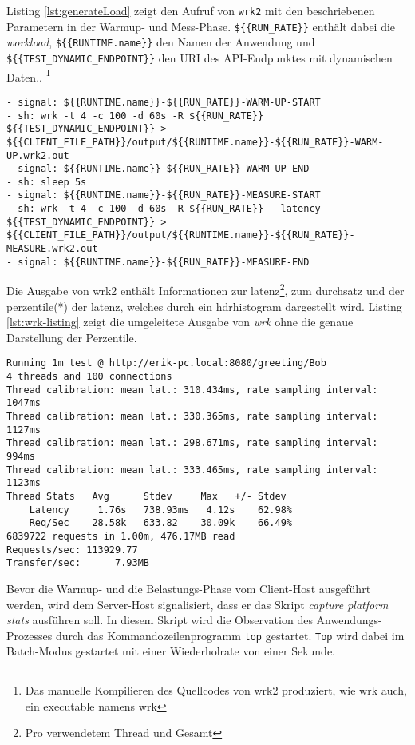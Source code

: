Listing \ref*{lst:generateLoad} zeigt den Aufruf von \verb|wrk2| mit den beschriebenen Parametern in der Warmup- und Mess-Phase.
\verb|${{RUN_RATE}}| enthält dabei die \textit{workload}, \verb|${{RUNTIME.name}}| den Namen der Anwendung und \verb|${{TEST_DYNAMIC_ENDPOINT}}| den
URI des API-Endpunktes mit dynamischen Daten..
\footnote{Das manuelle Kompilieren des Quellcodes von wrk2 produziert, wie wrk auch, ein executable namens wrk}

\begin{lstlisting}[caption=Auszug des qDup Skripts generate load, captionpos=b, label=lst:generateLoad]
- signal: ${{RUNTIME.name}}-${{RUN_RATE}}-WARM-UP-START
- sh: wrk -t 4 -c 100 -d 60s -R ${{RUN_RATE}} ${{TEST_DYNAMIC_ENDPOINT}} > ${{CLIENT_FILE_PATH}}/output/${{RUNTIME.name}}-${{RUN_RATE}}-WARM-UP.wrk2.out
- signal: ${{RUNTIME.name}}-${{RUN_RATE}}-WARM-UP-END
- sh: sleep 5s
- signal: ${{RUNTIME.name}}-${{RUN_RATE}}-MEASURE-START
- sh: wrk -t 4 -c 100 -d 60s -R ${{RUN_RATE}} --latency ${{TEST_DYNAMIC_ENDPOINT}} > ${{CLIENT_FILE_PATH}}/output/${{RUNTIME.name}}-${{RUN_RATE}}-MEASURE.wrk2.out
- signal: ${{RUNTIME.name}}-${{RUN_RATE}}-MEASURE-END
   \end{lstlisting}

Die Ausgabe von wrk2 enthält Informationen zur \Gls{latenz}\footnote{Pro verwendetem Thread und Gesamt},
zum \Gls{durchsatz} und der \Gls{perzentile}(*) der \Gls{latenz}, welches durch ein \acrshort{hdrhistogram} dargestellt wird.
Listing \ref*{lst:wrk-listing} zeigt die umgeleitete Ausgabe von \textit{wrk} ohne die genaue Darstellung der Perzentile.

\begin{lstlisting}[caption=Beispiel für Ausgabe von wrk,captionpos=b, label=lst:wrk-listing]
Running 1m test @ http://erik-pc.local:8080/greeting/Bob
4 threads and 100 connections
Thread calibration: mean lat.: 310.434ms, rate sampling interval: 1047ms
Thread calibration: mean lat.: 330.365ms, rate sampling interval: 1127ms
Thread calibration: mean lat.: 298.671ms, rate sampling interval: 994ms
Thread calibration: mean lat.: 333.465ms, rate sampling interval: 1123ms
Thread Stats   Avg      Stdev     Max   +/- Stdev
	Latency     1.76s   738.93ms   4.12s    62.98%
	Req/Sec    28.58k   633.82    30.09k    66.49%
6839722 requests in 1.00m, 476.17MB read
Requests/sec: 113929.77
Transfer/sec:      7.93MB
\end{lstlisting}

Bevor die Warmup- und die Belastungs-Phase vom Client-Host ausgeführt werden, wird dem Server-Host signalisiert, dass
er das Skript \textit{capture platform stats} ausführen soll.
In diesem Skript wird die Observation des Anwendungs-Prozesses durch das Kommandozeilenprogramm \verb|top| gestartet.
\verb|Top| wird dabei im Batch-Modus gestartet mit einer Wiederholrate von einer Sekunde.

